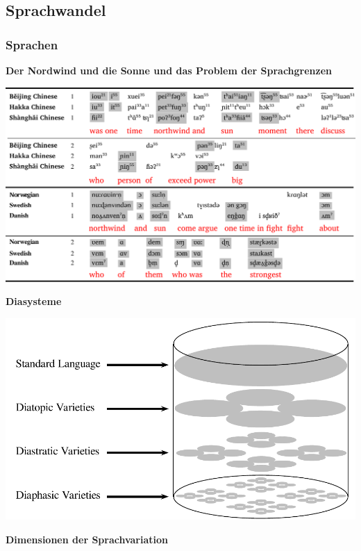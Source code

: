 
\subsection{\texorpdfstring{{Sprachwandel}}{Sprachwandel}}

\subsubsection{\texorpdfstring{{Sprachen}}{Sprachen}}

\par\noindent\textbf{Der Nordwind und die Sonne und das Problem der Sprachgrenzen}

\includegraphics[width=\textwidth]{img/northwind.pdf}

\par\noindent\textbf{Diasysteme}

\includegraphics[width=\textwidth]{img/diasystem.pdf}

\par\noindent\textbf{Dimensionen der Sprachvariation}

